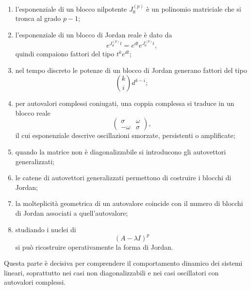 \begin{enumerate}
    \item l'esponenziale di un blocco nilpotente $J_0^{(p)}$ è un polinomio matriciale che si tronca al grado $p-1$;

    \item l'esponenziale di un blocco di Jordan reale è dato da
    \[
    e^{J_d^{(p)}t}=e^{dt}e^{J_0^{(p)}t},
    \]
    quindi compaiono fattori del tipo $t^k e^{dt}$;

    \item nel tempo discreto le potenze di un blocco di Jordan generano fattori del tipo
    \[
    \binom{k}{i}d^{k-i};
    \]

    \item per autovalori complessi coniugati, una coppia complessa si traduce in un blocco reale
    \[
    \begin{pmatrix}
    \sigma & \omega\\
    -\omega & \sigma
    \end{pmatrix},
    \]
    il cui esponenziale descrive oscillazioni smorzate, persistenti o amplificate;

    \item quando la matrice non è diagonalizzabile si introducono gli autovettori generalizzati;

    \item le catene di autovettori generalizzati permettono di costruire i blocchi di Jordan;

    \item la molteplicità geometrica di un autovalore coincide con il numero di blocchi di Jordan associati a quell'autovalore;

    \item studiando i nuclei di
    \[
    (A-\lambda I)^p
    \]
    si può ricostruire operativamente la forma di Jordan.
\end{enumerate}

Questa parte è decisiva per comprendere il comportamento dinamico dei sistemi lineari, soprattutto nei casi non diagonalizzabili e nei casi oscillatori con autovalori complessi.